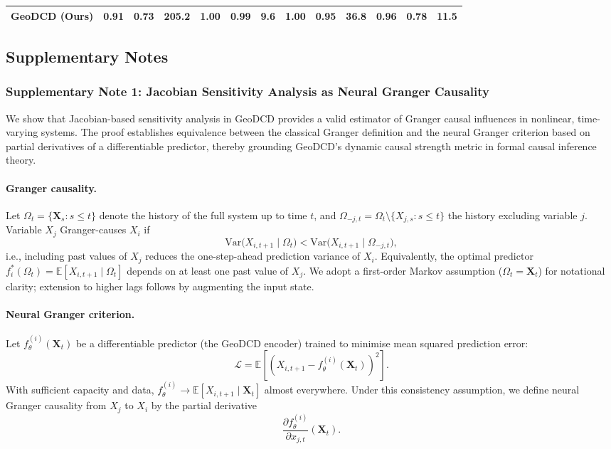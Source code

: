 \documentclass{article}
\begin{document}
\begin{table}[h]
{\begin{tabular}{lcccccccccccc}
        \midrule
        \textbf{GeoDCD (Ours)} & \textbf{0.91} & 0.73 & \textbf{205.2} & \textbf{1.00} & \textbf{0.99} & \textbf{9.6} & \textbf{1.00} & \textbf{0.95} & \textbf{36.8} & \textbf{0.96} & \textbf{0.78} & \textbf{11.5} \\
        \bottomrule
    \end{tabular}
    }
\end{table}

\subsection*{Supplementary Notes}

\subsubsection*{Supplementary Note 1: Jacobian Sensitivity Analysis as Neural Granger Causality}

We show that Jacobian-based sensitivity analysis in GeoDCD provides a valid estimator of Granger causal influences in nonlinear, time-varying systems. The proof establishes equivalence between the classical Granger definition and the neural Granger criterion based on partial derivatives of a differentiable predictor, thereby grounding GeoDCD's dynamic causal strength metric in formal causal inference theory.

\paragraph{Granger causality.}
Let \(\Omega_t = \{\mathbf{X}_{s}: s \le t\}\) denote the history of the full system up to time \(t\), and \(\Omega_{-j,t} = \Omega_t \setminus \{X_{j,s}: s \le t\}\) the history excluding variable \(j\). Variable \(X_j\) Granger-causes \(X_i\) if
\[
\mathrm{Var}\bigl(X_{i,t+1} \mid \Omega_t\bigr) < \mathrm{Var}\bigl(X_{i,t+1} \mid \Omega_{-j,t}\bigr),
\]
i.e., including past values of \(X_j\) reduces the one-step-ahead prediction variance of \(X_i\). Equivalently, the optimal predictor \(f_i^*(\Omega_t) = \mathbb{E}[X_{i,t+1} \mid \Omega_t]\) depends on at least one past value of \(X_j\). We adopt a first-order Markov assumption (\(\Omega_t = \mathbf{X}_t\)) for notational clarity; extension to higher lags follows by augmenting the input state.

\paragraph{Neural Granger criterion.}
Let \(f_\theta^{(i)}(\mathbf{X}_t)\) be a differentiable predictor (the GeoDCD encoder) trained to minimise mean squared prediction error:
\[
\mathcal{L} = \mathbb{E}\left[\left(X_{i,t+1} - f_\theta^{(i)}(\mathbf{X}_t)\right)^2\right].
\]
With sufficient capacity and data, \(f_\theta^{(i)} \to \mathbb{E}[X_{i,t+1} \mid \mathbf{X}_t]\) almost everywhere. Under this consistency assumption, we define neural Granger causality from \(X_j\) to \(X_i\) by the partial derivative
\[
\frac{\partial f_\theta^{(i)}}{\partial x_{j,t}}(\mathbf{X}_t).
\]
\end{document}
